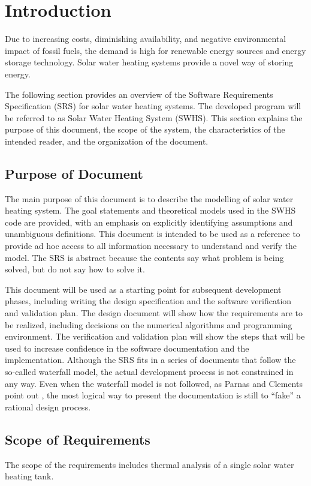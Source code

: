 \documentclass[12pt]{article}
\begin{document}
\section{Introduction}
\label{Sec:Intro}
Due to increasing costs, diminishing availability, and negative environmental impact of fossil fuels, the demand is high for renewable energy sources and energy storage technology. Solar water heating systems provide a novel way of storing energy.

The following section provides an overview of the Software Requirements Specification (SRS) for solar water heating systems. The developed program will be referred to as Solar Water Heating System (SWHS). This section explains the purpose of this document, the scope of the system, the characteristics of the intended reader, and the organization of the document.

\subsection{Purpose of Document}
\label{Sec:DocPurpose}
The main purpose of this document is to describe the modelling of solar water heating system. The goal statements and theoretical models used in the SWHS code are provided, with an emphasis on explicitly identifying assumptions and unambiguous definitions. This document is intended to be used as a reference to provide ad hoc access to all information necessary to understand and verify the model. The SRS is abstract because the contents say what problem is being solved, but do not say how to solve it.

This document will be used as a starting point for subsequent development phases, including writing the design specification and the software verification and validation plan. The design document will show how the requirements are to be realized, including decisions on the numerical algorithms and programming environment. The verification and validation plan will show the steps that will be used to increase confidence in the software documentation and the implementation. Although the SRS fits in a series of documents that follow the so-called waterfall model, the actual development process is not constrained in any way. Even when the waterfall model is not followed, as Parnas and Clements point out \cite{parnasClements1986}, the most logical way to present the documentation is still to ``fake'' a rational design process.

\subsection{Scope of Requirements}
\label{Sec:ReqsScope}
The scope of the requirements includes thermal analysis of a single solar water heating tank.
\end{document}

